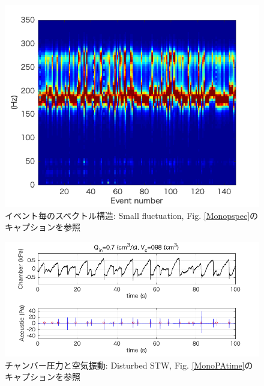 \documentclass[12pt]{article}
\begin{document}
\begin{figure}[H]
\begin{center}
\includegraphics[scale=1] {Flctpspec.png} 
\caption[イベント毎のスペクトル構造: Small fluctuation]
{イベント毎のスペクトル構造: Small fluctuation, Fig. \ref{Monopspec}のキャプションを参照}
\label{Flctpspec}
\end{center}
\end{figure} 


\begin{figure}[H]
\begin{center}
\includegraphics[scale=1] {DistPAtime.png} 
\caption[チャンバー圧力と空気振動: Disturbed STW]
{チャンバー圧力と空気振動: Disturbed STW, Fig. \ref{MonoPAtime}のキャプションを参照}
\label{DistPAtime}
\end{center}
\end{figure} 
\end{document}
